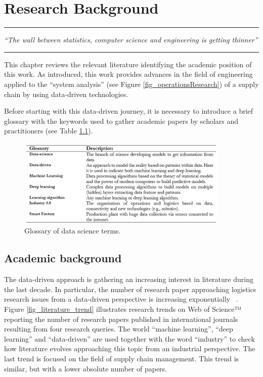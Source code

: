 \chapter{Research Background}

\noindent\rule{4cm}{0.4pt}\par
\textit{“The wall between statistics, computer science and engineering is getting thinner”}\par
\noindent\rule{8cm}{0.4pt} \bigskip

This chapter reviews the relevant literature identifying the academic position of this work. As introduced, this work provides advances in the field of engineering applied to the “system analysis” (see Figure \ref{fig_operationsResearch}) of a supply chain by using data-driven technologies.\par

Before starting with this data-driven journey, it is necessary to introduce a brief glossary with the keywords used to gather academic papers by scholars and practitioners (see Table \ref{tab_dataGlossary}).

\begin{figure}[hbt!]
\centering
\includegraphics[width=0.9\textwidth]{SectionIntroduction/researchBackground_figures/tab_dataGlossary.png}
\captionsetup{type=figure}
\caption{Glossary of data science terms.}
\label{tab_dataGlossary}
\end{figure}

\section{Academic background}

The data-driven approach is gathering an increasing interest in literature during the last decade. In particular, the number of research paper approaching logistics research issues from a data-driven perspective is increasing exponentially ~\cite{Moktadir2019, Spanaki2018}. Figure \ref{fig_literature_trend} illustrates research trends on Web of Science™ reporting the number of research papers published in international journals resulting from four research queries. The world “machine learning”, “deep learning” and “data-driven” are used together with the word “industry” to check how literature evolves approaching this topic from an industrial perspective. The last trend is focused on the field of supply chain management. This trend is similar, but with a lower absolute number of papers.

